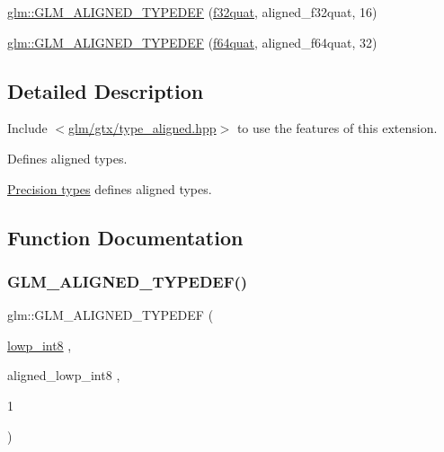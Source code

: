 \begin{DoxyCompactItemize}
\item 
\hyperlink{group__gtx__type__aligned_ga1ed8aeb5ca67fade269a46105f1bf273}{glm\+::\+G\+L\+M\+\_\+\+A\+L\+I\+G\+N\+E\+D\+\_\+\+T\+Y\+P\+E\+D\+EF} (\hyperlink{group__gtc__type__precision_gac59c4d798396552e4bbb866b3d8a2f18}{f32quat}, aligned\+\_\+f32quat, 16)
\item 
\hyperlink{group__gtx__type__aligned_ga95cc03b8b475993fa50e05e38e203303}{glm\+::\+G\+L\+M\+\_\+\+A\+L\+I\+G\+N\+E\+D\+\_\+\+T\+Y\+P\+E\+D\+EF} (\hyperlink{group__gtc__type__precision_ga5b54d7b36fbee5e271f73e6ed74e7172}{f64quat}, aligned\+\_\+f64quat, 32)
\end{DoxyCompactItemize}


\subsection{Detailed Description}
Include $<$\hyperlink{gtx_2type__aligned_8hpp}{glm/gtx/type\+\_\+aligned.\+hpp}$>$ to use the features of this extension.

Defines aligned types.

\hyperlink{group__core__precision}{Precision types} defines aligned types. 

\subsection{Function Documentation}
\mbox{\label{group__gtx__type__aligned_gab5cd5c5fad228b25c782084f1cc30114}} 
\subsubsection{\texorpdfstring{G\+L\+M\+\_\+\+A\+L\+I\+G\+N\+E\+D\+\_\+\+T\+Y\+P\+E\+D\+E\+F()}{GLM\_ALIGNED\_TYPEDEF()}\hspace{0.1cm}{\footnotesize\ttfamily [1/209]}}
{\footnotesize\ttfamily glm\+::\+G\+L\+M\+\_\+\+A\+L\+I\+G\+N\+E\+D\+\_\+\+T\+Y\+P\+E\+D\+EF (\begin{DoxyParamCaption}\item[{\hyperlink{group__gtc__type__precision_gaf9e675b6392764242ae87eb179e9d3d6}{lowp\+\_\+int8}}]{,  }\item[{aligned\+\_\+lowp\+\_\+int8}]{,  }\item[{1}]{ }\end{DoxyParamCaption})}



